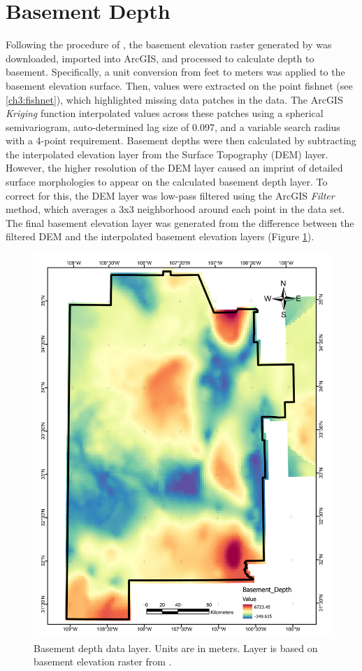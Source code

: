 \section{Basement Depth}\label{app:dl_basement_depth}
Following the procedure of \citet{pepin_new_2019}, the basement elevation raster generated by \citet{bielicki_hydrogeolgic_2015} was downloaded, imported into ArcGIS, and processed to calculate depth to basement. Specifically, a unit conversion from feet to meters was applied to the basement elevation surface. Then, values were extracted on the point fishnet (see \ref{ch3:fishnet}), which highlighted missing data patches in the data. The ArcGIS \textit{Kriging} function interpolated values across these patches using a spherical semivariogram, auto-determined lag size of 0.097, and a variable search radius with a 4-point requirement. Basement depths were then calculated by subtracting the interpolated elevation layer from the Surface Topography (DEM) layer. However, the higher resolution of the DEM layer caused an imprint of detailed surface morphologies to appear on the calculated basement depth layer. To correct for this, the DEM layer was low-pass filtered using the ArcGIS \textit{Filter} method, which averages a 3x3 neighborhood around each point in the data set. The final basement elevation layer was generated from the difference between the filtered DEM and the interpolated basement elevation layers (Figure \ref{fig:feat_basementdepth}).
\vfill
\pagebreak

\begin{figure}[H]
\centering
\includegraphics[width=0.75\linewidth]{templates/images/Figure-BasementDepth.pdf}
\caption[Basement depth data layer]{Basement depth data layer. Units are in meters. Layer is based on basement elevation raster from \protect\citet{bielicki_hydrogeolgic_2015}.}
\label{fig:feat_basementdepth}
\end{figure}
\pagebreak

